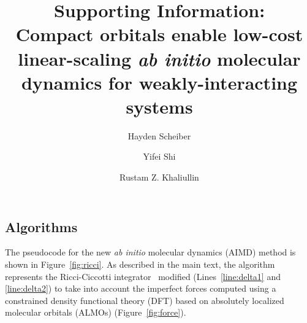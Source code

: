 \documentclass[aip,jcp,reprint,amsmath,amssymb]{revtex4-1}
\begin{document}
\renewcommand{\thefigure}{S\arabic{figure}}

\title{
Supporting Information: \\
Compact orbitals enable low-cost linear-scaling \emph{ab initio} molecular dynamics for weakly-interacting systems
}

\author{Hayden Scheiber}
\author{Yifei Shi}
\author{Rustam Z. Khaliullin}

\maketitle

\subsection{Algorithms}

The pseudocode for the new \emph{ab initio} molecular dynamics (AIMD) method is shown in Figure~\ref{fig:ricci}. As described in the main text, the algorithm represents the Ricci-Ciccotti integrator~\cite{Ricci2003} modified (Lines~\ref{line:delta1} and \ref{line:delta2}) to take into account the imperfect forces computed using a constrained density functional theory (DFT) based on absolutely localized molecular orbitals (ALMOs) (Figure~\ref{fig:force}). 
\end{document}
